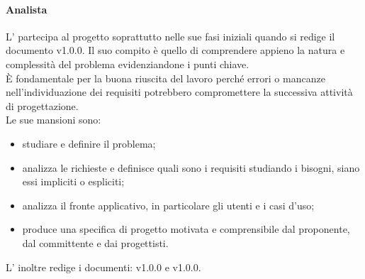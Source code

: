             \paragraph{Analista}
                L’ partecipa al progetto soprattutto nelle sue fasi iniziali quando si redige il documento  v1.0.0. Il suo compito è quello di comprendere appieno la natura e complessità del problema evidenziandone i punti chiave. \\
                È fondamentale per la buona riuscita del lavoro perché errori o mancanze nell’individuazione dei requisiti potrebbero compromettere la successiva attività di progettazione.\\
                Le sue mansioni sono:\\
                \begin{itemize}
                    \item studiare e definire il problema;
                    \item analizza le richieste e definisce quali sono i requisiti studiando i bisogni, siano essi impliciti o espliciti;
                    \item analizza il fronte applicativo, in particolare gli utenti e i casi d’uso;
                    \item produce una specifica di progetto motivata e comprensibile dal proponente, dal committente e dai progettisti.
                \end{itemize}
                L’ inoltre redige i documenti:  v1.0.0 e  v1.0.0.
